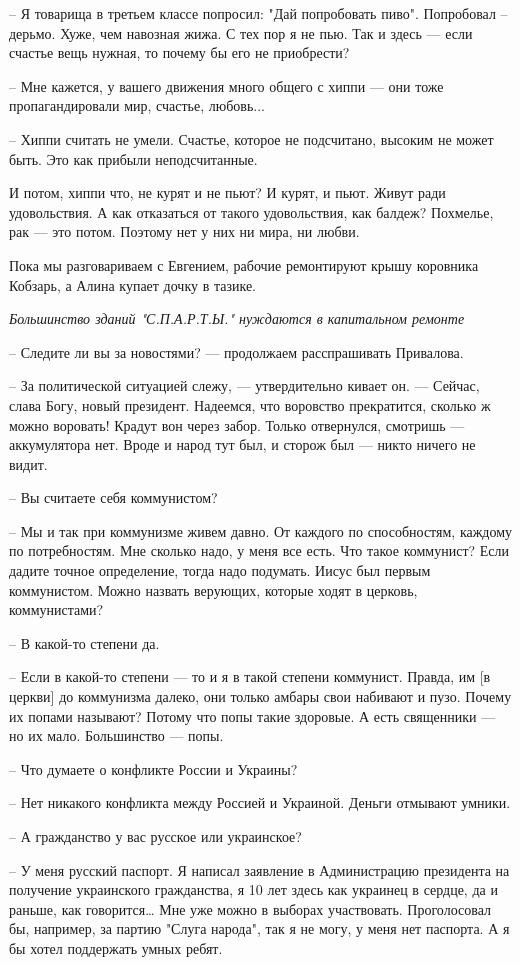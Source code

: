 \documentclass[a4paper,11pt]{extreport}
\begin{document}
– Я товарища в третьем классе попросил: "Дай попробовать пиво". Попробовал –
дерьмо. Хуже, чем навозная жижа. С тех пор я не пью. Так и здесь --- если счастье
вещь нужная, то почему бы его не приобрести? 

– Мне кажется, у вашего движения много общего с хиппи --- они тоже
пропагандировали мир, счастье, любовь...

– Хиппи считать не умели. Счастье, которое не подсчитано, высоким не может
быть. Это как прибыли неподсчитанные. 

И потом, хиппи что, не курят и не пьют? И курят, и пьют. Живут ради
удовольствия. А как отказаться от такого удовольствия, как балдеж? Похмелье,
рак --- это потом. Поэтому нет у них ни мира, ни любви.

Пока мы разговариваем с Евгением, рабочие ремонтируют крышу коровника Кобзарь,
а Алина купает дочку в тазике.

\emph{Большинство зданий "С.П.А.Р.Т.Ы." нуждаются в капитальном ремонте}

– Следите ли вы за новостями? --- продолжаем расспрашивать Привалова.

– За политической ситуацией слежу, --- утвердительно кивает он. --- Сейчас, слава
Богу, новый президент. Надеемся, что воровство прекратится, сколько ж можно
воровать! Крадут вон через забор. Только отвернулся, смотришь --- аккумулятора
нет. Вроде и народ тут был, и сторож был --- никто ничего не видит.

– Вы считаете себя коммунистом?

– Мы и так при коммунизме живем давно. От каждого по способностям, каждому по
потребностям. Мне сколько надо, у меня все есть. Что такое коммунист? Если
дадите точное определение, тогда надо подумать. Иисус был первым коммунистом.
Можно назвать верующих, которые ходят в церковь, коммунистами?

– В какой-то степени да.

– Если в какой-то степени --- то и я в такой степени коммунист. Правда, им [в
церкви] до коммунизма далеко, они только амбары свои набивают и пузо. Почему их
попами называют? Потому что попы такие здоровые. А есть священники --- но их
мало. Большинство --- попы.

– Что думаете о конфликте России и Украины?

– Нет никакого конфликта между Россией и Украиной. Деньги отмывают умники.

– А гражданство у вас русское или украинское?

– У меня русский паспорт. Я написал заявление в Администрацию президента на
получение украинского гражданства, я 10 лет здесь как украинец в сердце, да и
раньше, как говорится… Мне уже можно в выборах участвовать. Проголосовал бы,
например, за партию "Слуга народа", так я не могу, у меня нет паспорта. А я бы
хотел поддержать умных ребят. 
\end{document}
